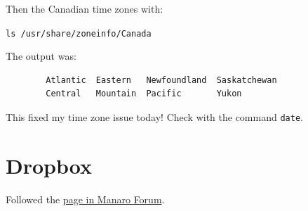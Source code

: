 \documentclass[]{scrartcl}
\begin{document}
	Then the Canadian time zones with:
	
	\verb|ls /usr/share/zoneinfo/Canada|
	
	The output was:
	
	\begin{verbatim}
		Atlantic  Eastern   Newfoundland  Saskatchewan
		Central   Mountain  Pacific       Yukon
	\end{verbatim}
	
	This fixed my time zone issue today! Check with the command \texttt{date}.
	
	\section{Dropbox}
	
	Followed the \href{https://forum.manjaro.org/t/dropbox-install-new-to-manjaro/9576/5}{page in Manaro Forum}.
	
\end{document}
